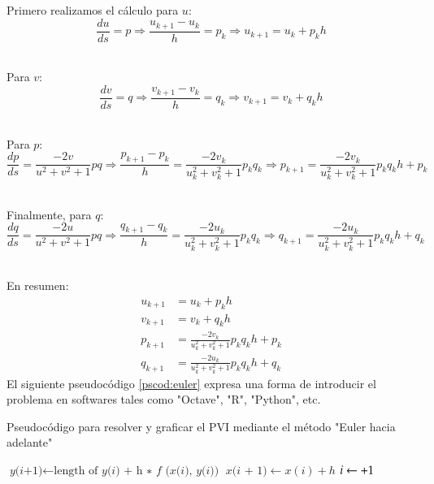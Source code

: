 \documentclass{endm}
\begin{document}
Primero realizamos el c\'alculo para $u$:\\
{\small
$$\frac{du}{ds}=p \Rightarrow \frac{u_{k+1}-u_k}{h}=p_k \Rightarrow u_{k+1}=u_k+p_k h $$\\
}

    Para $v$:\\
{\small
$$\frac{dv}{ds}=q \Rightarrow \frac{v_{k+1}-v_k}{h}=q_k \Rightarrow v_{k+1}=v_k+q_k h $$\\
}

    Para $p$:\\
{\small
$$\frac{dp}{ds}=\frac{-2v}{u^2+v^2+1} pq \Rightarrow \frac{p_{k+1}-p_k}{h}=\frac{-2v_k}{u_k^2+v_k^2+1} p_kq_k \Rightarrow p_{k+1}=\frac{-2v_k }{u_k^2+v_k^2+1} p_kq_k h + p_k $$\\
}

\tab Finalmente, para $q$:\\
{\small
$$ \frac{dq}{ds}=\frac{-2u}{u^2+v^2+1} pq \Rightarrow \frac{q_{k+1}-q_k}{h}=\frac{-2u_k}{u_k^2+v_k^2+1} p_kq_k \Rightarrow q_{k+1}=\frac{-2u_k}{u_k^2+v_k^2+1} p_kq_k h +q_k $$\\
}


En resumen:
{\small
\begin{align}
u_{k+1}&=u_k+p_k h \label{eq:dudis} \\
v_{k+1}&=v_k+q_k h \label{eq:dvdis} \\
p_{k+1}&=\frac{-2v_k }{u_k^2+v_k^2+1} p_kq_k h + p_k \label{eq:dpdis} \\
q_{k+1}&=\frac{-2u_k}{u_k^2+v_k^2+1} p_kq_k h +q_k\label{eq:dqdis}
\end{align}
}
El  siguiente pseudoc\'odigo \ref{pscod:euler} expresa una forma de introducir el problema en softwares tales como "Octave", "R", "Python", etc.

\begin{algorithm}
  \caption{Pseudoc\'odigo para resolver y graficar el PVI mediante el m\'etodo "Euler hacia adelante"}
    \label{pscod:euler}
  \begin{algorithmic}[1]
  \State $\textit{y(i+1)} \gets \text{length of }\textit{y(i) + h ∗ f (x(i), y(i))}$
  \State $\textit{x(i + 1)} \gets x(i) + h$ 
  \State$i\gets\relax+1$
   \EndWhile
  \end{algorithmic}
\end{algorithm}


%
\end{document}

